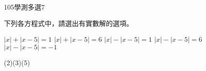     \begin{QUESTION}
        \begin{ExamInfo}{105}{學測}{多選}{7}
        \end{ExamInfo}
        \begin{ExamAnsRateInfo}{54}{81}{52}{29}
        \end{ExamAnsRateInfo}
        \begin{QBODY}
            下列各方程式中，請選出有實數解的選項。
			\begin{QOPS}
				\QOP $\left| x \right|+\left| x-5 \right|=1$
				\QOP $\left| x \right|+\left| x-5 \right|=6$
				\QOP $\left| x \right|-\left| x-5 \right|=1$
				\QOP $\left| x \right|-\left| x-5 \right|=6$
				\QOP $\left| x \right|-\left| x-5 \right|=-1$
			\end{QOPS}
        \end{QBODY}
        \begin{QFROMS}
        \end{QFROMS}
        \begin{QTAGS}\end{QTAGS}
        \begin{QANS}
            (2)(3)(5)
        \end{QANS}
        \begin{QSOLLIST}
        \end{QSOLLIST}
        \begin{QEMPTYSPACE}
        \end{QEMPTYSPACE}
    \end{QUESTION}
